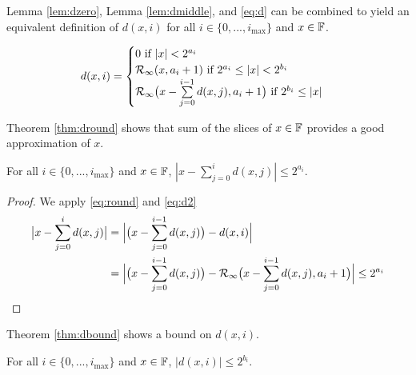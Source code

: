     Lemma \ref{lem:dzero}, Lemma \ref{lem:dmiddle}, and \eqref{eq:d} can be
    combined to yield an equivalent definition of $d(x, i)$ for all $i \in \{0,
    ..., i_{\max}\}$ and $x \in \mathbb{F}$.

    \begin{equation}
      d(x, i) = \begin{cases}
        0 \text{ if } |x| < 2^{a_i}\\
        \mathcal{R}_\text{$\infty$}(x, a_i + 1) \text{ if } 2^{a_i} \leq |x| < 2^{b_i}\\
        \mathcal{R}_\text{$\infty$}\bigl(x - \sum\limits_{j=0}^{i - 1}d(x,j), a_i + 1\bigr) \text{ if } 2^{b_i} \leq |x|
        \end{cases}
      \label{eq:d2}
    \end{equation}

    Theorem \ref{thm:dround} shows that sum of the slices of $x \in \mathbb{F}$
    provides a good approximation of $x$.

    \begin{samepage}
    \begin{thm}
      For all $i \in \{0, ..., i_{\max}\}$ and $x \in \mathbb{F}$,
      $|x - \sum \limits_{j = 0}^id(x, j)| \leq 2^{a_i}$.
      \label{thm:dround}
    \end{thm}
    \end{samepage}

    \begin{proof}
      We apply  \eqref{eq:round} and \eqref{eq:d2}
      \begin{align*}
        \bigl|x - \sum \limits_{j = 0}^{i}d(x, j)\bigr| & = \Bigl|\bigl(x - \sum \limits_{j = 0}^{i - 1}d(x, j)\bigr) - d(x, i)\Bigr| \\
         & = \Bigl|\bigl(x - \sum \limits_{j = 0}^{i - 1}d(x, j)\bigr) - \mathcal{R}_\text{$\infty$}\bigl(x - \sum \limits_{j = 0}^{i - 1}d(x, j), a_{i} + 1\bigr)\Bigr| \leq 2^{a_{i}}
      \end{align*}
    \end{proof}

    Theorem \ref{thm:dbound} shows a bound on $d(x, i)$.

    \begin{samepage}
    \begin{thm}
      For all $i \in \{0, ..., i_{\max}\}$ and $x \in \mathbb{F}$, $|d(x, i)| \leq 2^{b_i}$.
      \label{thm:dbound}
    \end{thm}
    \end{samepage}

